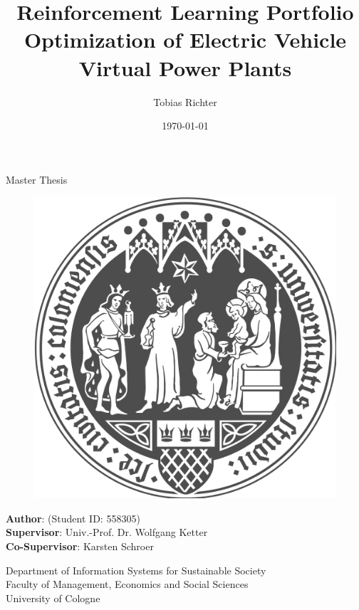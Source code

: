 \documentclass[a4paper, 12pt]{article}
\author{Tobias Richter}
\date{\today}
\title{Reinforcement Learning Portfolio Optimization of Electric Vehicle Virtual Power Plants}
\newcommand{\studentID}{558305}
\newcommand{\thesistype}{Master Thesis}
\newcommand{\supervisor}{Univ.-Prof. Dr. Wolfgang Ketter}
\newcommand{\cosupervisor}{Karsten Schroer}
\begin{document}
\makeatletter
\begin{titlepage}
    \begin{center}
        \vspace*{1cm}

        \Large
        \textbf{\@title{}}

        \vspace{1.5cm}

        \thesistype{}

        \vspace{1cm}

        \begin{figure}[htbp]
             \centering
             \includegraphics[width=.5\linewidth]{./fig/UoC_Logo.png}
        \end{figure}

        \vspace{1cm}

        \large
        \textbf{Author}: \@author{} (Student ID: \studentID{})\\
        \large
        \textbf{Supervisor}: \supervisor{}\\
        \large
        \textbf{Co-Supervisor}: \cosupervisor{}

        \vspace{1cm}
        \large
        Department of Information Systems for Sustainable Society\\
        Faculty of Management, Economics and Social Sciences\\
        University of Cologne\\

        \vspace{1cm}
        \@date{}

    \end{center}
\end{titlepage}
\makeatother
\clearpage
\thispagestyle{empty}
\end{document}
